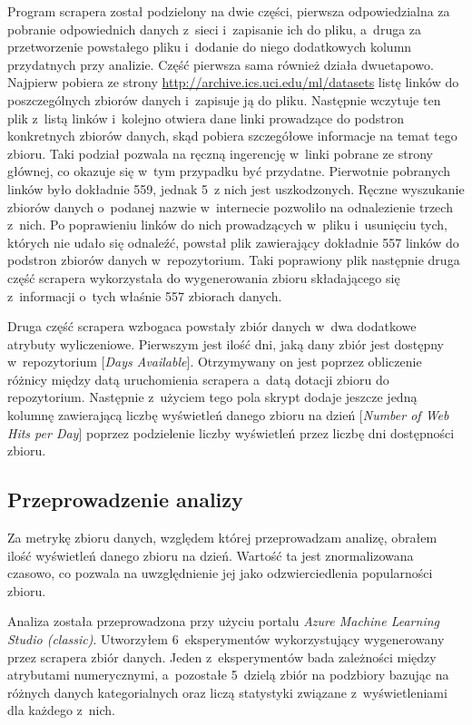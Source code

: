 Program scrapera został podzielony na dwie części, pierwsza odpowiedzialna za pobranie odpowiednich danych z~sieci i~zapisanie ich do pliku, a~druga za przetworzenie powstałego pliku i~dodanie do niego dodatkowych kolumn przydatnych przy analizie.
Część pierwsza sama również działa dwuetapowo.
Najpierw pobiera ze strony \url{http://archive.ics.uci.edu/ml/datasets} listę linków do poszczególnych zbiorów danych i~zapisuje ją do pliku.
Następnie wczytuje ten plik z~listą linków i~kolejno otwiera dane linki prowadzące do podstron konkretnych zbiorów danych, skąd pobiera szczegółowe informacje na temat tego zbioru.
Taki podział pozwala na ręczną ingerencję w~linki pobrane ze strony głównej, co okazuje się w~tym przypadku być przydatne.
Pierwotnie pobranych linków było dokładnie 559, jednak 5~z nich jest uszkodzonych.
Ręczne wyszukanie zbiorów danych o~podanej nazwie w~internecie pozwoliło na odnalezienie trzech z~nich.
Po poprawieniu linków do nich prowadzących w~pliku i~usunięciu tych, których nie udało się odnaleźć, powstał plik zawierający dokładnie 557 linków do podstron zbiorów danych w~repozytorium.
Taki poprawiony plik następnie druga część scrapera wykorzystała do wygenerowania zbioru składającego się z~informacji o~tych właśnie 557 zbiorach danych.

Druga część scrapera wzbogaca powstały zbiór danych w~dwa dodatkowe atrybuty wyliczeniowe.
Pierwszym jest ilość dni, jaką dany zbiór jest dostępny w~repozytorium [\emph{Days Available}].
Otrzymywany on jest poprzez obliczenie różnicy między datą uruchomienia scrapera a~datą dotacji zbioru do repozytorium.
Następnie z~użyciem tego pola skrypt dodaje jeszcze jedną kolumnę zawierającą liczbę wyświetleń danego zbioru na dzień [\emph{Number of Web Hits per Day}] poprzez podzielenie liczby wyświetleń przez liczbę dni dostępności zbioru.

\subsection{Przeprowadzenie analizy}

Za metrykę zbioru danych, względem której przeprowadzam analizę, obrałem ilość wyświetleń danego zbioru na dzień.
Wartość ta jest znormalizowana czasowo, co pozwala na uwzględnienie jej jako odzwierciedlenia popularności zbioru.

Analiza została przeprowadzona przy użyciu portalu \emph{Azure Machine Learning Studio (classic)}.
Utworzyłem 6~eksperymentów wykorzystujący wygenerowany przez scrapera zbiór danych.
Jeden z~eksperymentów bada zależności między atrybutami numerycznymi, a~pozostałe 5~dzielą zbiór na podzbiory bazując na różnych danych kategorialnych oraz liczą statystyki związane z~wyświetleniami dla każdego z~nich.

